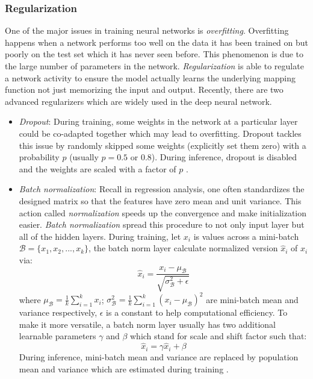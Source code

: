 \documentclass[conference]{IEEEtran}
\begin{document}
\subsubsection{Regularization}
One of the major issues in training neural networks is \textit{overfitting}. Overfitting happens when a network performs too well on the data it has been trained on but poorly on the test set which it has never seen before. This phenomenon is due to the large number of parameters in the network. \textit{Regularization} is able to regulate a network activity to ensure the model actually learns the underlying mapping function not just memorizing the input and output. Recently, there are two advanced regularizers which are widely used in the deep neural network.
\begin{itemize}
    \item \textit{Dropout}: During training, some weights in the network at a particular layer could be co-adapted together which may lead to overfitting. Dropout tackles this issue by randomly skipped some weights (explicitly set them zero) with a probability $p$ (usually $p=0.5$ or $0.8$). During inference, dropout is disabled and the weights are scaled with a factor of $p$ \cite{Dropout}.
    \item \textit{Batch normalization}: Recall in regression analysis, one often standardizes the designed matrix so that the features have zero mean and unit variance. This action called \textit{normalization} speeds up the convergence and make initialization easier. \textit{Batch normalization} spread this procedure to not only input layer but all of the hidden layers. During training, let $x_i$ is values across a mini-batch $\mathcal{B} = \{x_1, x_2, ..., x_k \}$, the batch norm layer calculate normalized version $\hat{x}_i$ of $x_i$ via:
    $$\hat{x}_i = \frac{x_i - \mu_{\mathcal{B}}}{\sqrt{\sigma^2_{\mathcal{B}} + \epsilon}}$$
    where $\mu_{\mathcal{B}} = \frac{1}{k}\sum_{i=1}^{k}x_i$; $\sigma^2_{\mathcal{B}} = \frac{1}{k} \sum_{i=1}^{k}(x_i - \mu_{\mathcal{B}})^2$ are mini-batch mean and variance respectively, $\epsilon$ is a constant to help computational efficiency. To make it more versatile, a batch norm layer usually has two additional learnable parameters $\gamma$ and $\beta$ which stand for scale and shift factor such that:
    $$\hat{x}_i = \gamma \hat{x}_i + \beta$$
    During inference, mini-batch mean and variance are replaced by population mean and variance which are estimated during training \cite{Batchnorm}.
\end{itemize}
\end{document}
